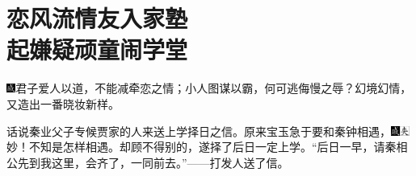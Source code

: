 

\chapter{恋风流情友入家塾\\起嫌疑顽童闹学堂}

{\includegraphics[width=3mm]{../Images/00005}\kaishu 君子爱人以道，不能减牵恋之情；小人图谋以霸，何可逃侮慢之辱？幻境幻情，又造出一番晓妆新样。}

话说秦业父子专候贾家的人来送上学择日之信。原来宝玉急于要和秦钟相遇，{\includegraphics[width=3mm]{../Images/00005}\includegraphics[width=3mm]{../Images/00012}\footnotesize \kaishu 妙！不知是怎样相遇。}却顾不得别的，遂择了后日一定上学。``后日一早，请秦相公先到我这里，会齐了，一同前去。''------打发人送了信。

